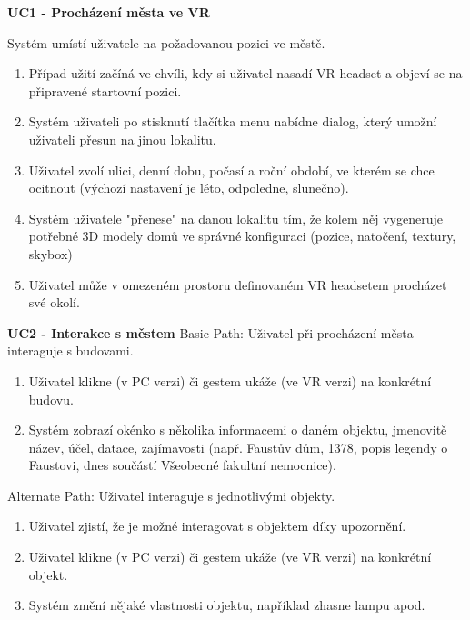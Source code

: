 \documentclass[thesis=B,czech]{FITthesis}[2012/06/26]
\begin{document}
	\begin{description}
	
 		\item \textbf{UC1 - Procházení města ve VR}
 		
 			Systém umístí uživatele na požadovanou pozici ve městě.
 		 	
 		 	\begin{enumerate}
 		 		\item Případ užití začíná ve chvíli, kdy si uživatel nasadí VR headset a objeví se na připravené startovní pozici.
				\item Systém uživateli po stisknutí tlačítka menu nabídne dialog, který umožní uživateli přesun na jinou lokalitu.
				\item Uživatel zvolí ulici, denní dobu, počasí a roční období, ve kterém se chce ocitnout (výchozí nastavení je léto, odpoledne, slunečno).
				\item Systém uživatele "přenese" na danou lokalitu tím, že kolem něj vygeneruje potřebné 3D modely domů ve správné konfiguraci (pozice, natočení, textury, skybox)
				\item Uživatel může v omezeném prostoru definovaném VR headsetem procházet své okolí.
			\end{enumerate} 		 			
 			

 		\item \textbf{UC2 - Interakce s městem}
		Basic Path: Uživatel při procházení města interaguje s budovami. 		
 		
 		\begin{enumerate}
				\item Uživatel klikne (v PC verzi) či gestem ukáže (ve VR verzi) na konkrétní budovu.
				\item Systém zobrazí okénko s několika informacemi o daném objektu, jmenovitě název, účel, datace, zajímavosti (např. Faustův dům, 1378, popis legendy o Faustovi, dnes součástí Všeobecné fakultní nemocnice).
 		\end{enumerate}
 		
 		Alternate Path: Uživatel interaguje s jednotlivými objekty.
 		\begin{enumerate}
				\item Uživatel zjistí, že je možné interagovat s objektem díky upozornění.
				\item Uživatel klikne (v PC verzi) či gestem ukáže (ve VR verzi) na konkrétní objekt.
				\item Systém změní nějaké vlastnosti objektu, například zhasne lampu apod.
 		\end{enumerate}
 		

\end{description}
\end{document}
